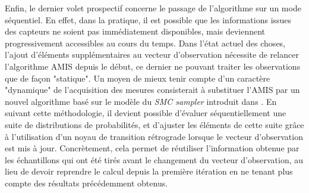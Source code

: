 Enfin, le dernier volet prospectif concerne le passage de l'algorithme sur un mode séquentiel. En effet, dans la pratique, il est possible que les informations issues des capteurs ne soient pas immédiatement disponibles, mais deviennent progressivement accessibles au cours du temps. Dans l'état actuel des choses, l'ajout d'éléments supplémentaires au vecteur d'observation nécessite de relancer l'algorithme AMIS depuis le début, ce dernier ne pouvant traiter les observations que de façon "statique". Un moyen de mieux tenir compte d'un caractère "dynamique" de l'acquisition des mesures consisterait à substituer l'AMIS par un nouvel algorithme basé sur le modèle du \textit{SMC sampler} introduit dans \cite{Delmoral2006}. En suivant cette méthodologie, il devient possible d'évaluer séquentiellement une suite de distributions de probabilités, et d'ajuster les éléments de cette suite grâce à l'utilisation d'un noyau de transition rétrograde lorsque le vecteur d'observation est mis à jour. Concrètement, cela permet de réutiliser l'information obtenue par les échantillons qui ont été tirés avant le changement du vecteur d'observation, au lieu de devoir reprendre le calcul depuis la première itération en ne tenant plus compte des résultats précédemment obtenus. 


